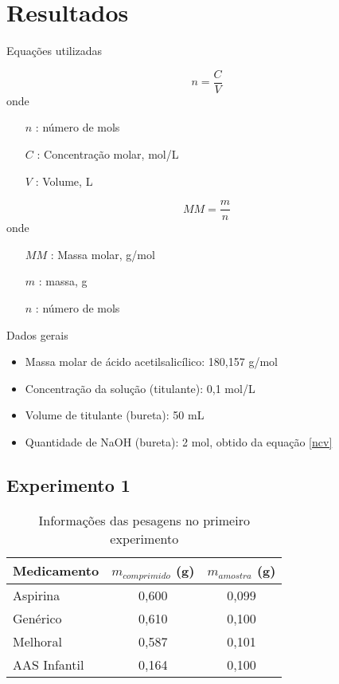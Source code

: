 \chapter{Resultados}\label{resultadosk}

Equações utilizadas

\begin{equation}\label{ncv}
     n = \frac{C}{V} 
\end{equation}
onde
\begin{itemize}
    \item[$n$ :] número de mols
    \item[$C$ :] Concentração molar, mol/L
    \item[$V$ :] Volume, L
\end{itemize}

\begin{equation}\label{massamolar}
    MM = \frac{m}{n} 
\end{equation}
onde
\begin{itemize}
    \item[$MM$ :] Massa molar, g/mol
    \item[$m$ :] massa, g
    \item[$n$ :] número de mols
\end{itemize}


\bigskip
Dados gerais

\begin{itemize}
     \item Massa molar de ácido acetilsalicílico: 180,157 g/mol
     \item Concentração da solução (titulante): 0,1 mol/L
     \item Volume de titulante (bureta): 50 mL
     \item Quantidade de NaOH (bureta): 2 mol, obtido da equação \eqref{ncv}
\end{itemize}

\section{Experimento 1}\label{res_exp1}

\begin{table}[H]\label{t:peso_1}
    \centering
    \begin{tabular}{l c c}
       \toprule
       Medicamento & $m_{comprimido}$ (g) & $m_{amostra}$ (g) \\
       \midrule
       Aspirina\R & 0,600 & 0,099  \\
       Genérico & 0,610 & 0,100  \\
       Melhoral & 0,587 & 0,101 \\
       AAS Infantil & 0,164 & 0,100 \\
        \bottomrule
    \end{tabular}
    \caption{Informações das pesagens no primeiro experimento}
\end{table}

